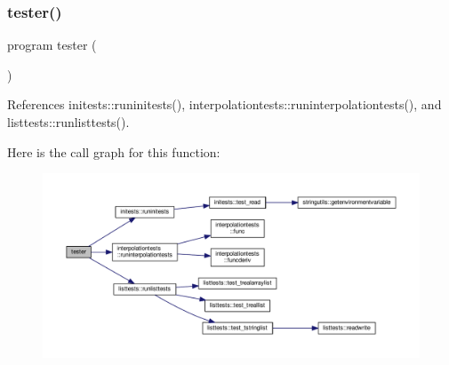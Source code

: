 \subsubsection{\texorpdfstring{tester()}{tester()}}
{\footnotesize\ttfamily program tester (\begin{DoxyParamCaption}{ }\end{DoxyParamCaption})}



References initests\+::runinitests(), interpolationtests\+::runinterpolationtests(), and listtests\+::runlisttests().

Here is the call graph for this function\+:
\nopagebreak
\begin{figure}[H]
\begin{center}
\leavevmode
\includegraphics[width=350pt]{general__unittests_8f90_abb1af5b22eb90cec23fca42accb63245_cgraph}
\end{center}
\end{figure}
